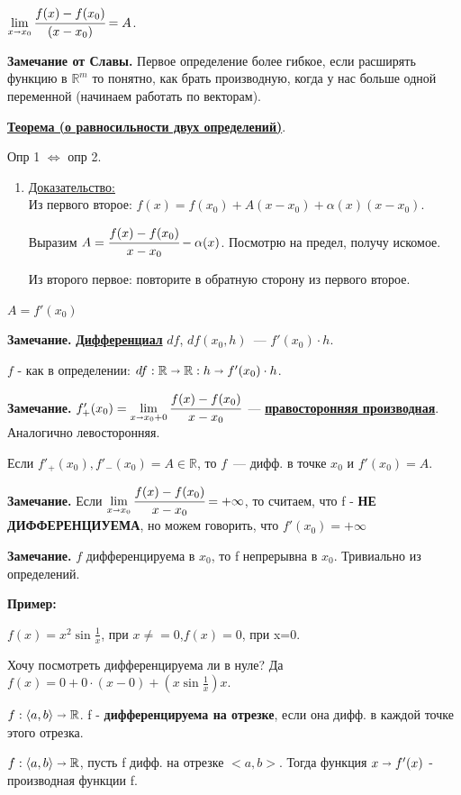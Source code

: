 \documentclass{article}
\newcommand{\deff}[1]{\underline{\textbf{#1}}}
\newcommand{\thmm}[1]{\underline{\textbf{#1}}}
\newcommand{\prooff}[1]{{\underline{Доказательство:}} \\ }
\begin{document}
$\lim\limits_{x\shortrightarrow x_0}\cfrac{f(x)-f(x_0)}{(x-x_0)} = A$.

\textbf{Замечание от Славы.} Первое определение более гибкое, если расширять функцию в $\mathbb{R}^m$ то понятно, как брать производную, когда у нас больше одной переменной (начинаем работать по векторам).

\thmm{Теорема (о равносильности двух определений)}.

Опр 1 $\Leftrightarrow$ опр 2.

\begin{enumerate}
    \item[] \prooff{}
    Из первого второе: $f(x) = f(x_0)  + A(x-x_0) + \alpha(x)(x-x_0)$.

    Выразим $A = \cfrac{f(x)-f(x_0)}{x-x_0} - \alpha(x)$. Посмотрю на предел, получу искомое.

    Из второго первое: повторите в обратную сторону из первого второе.
\end{enumerate}

$A = f'(x_0)$

\textbf{Замечание.} \deff{Дифференциал} $df$, $df(x_0,h)$~--- $f'(x_0) \cdot h$.

$f$ - как в определении: $df: \mathbb{R} \shortrightarrow \mathbb{R}: h \shortrightarrow f'(x_0) \cdot h$.

\textbf{Замечание.} $f'_+(x_0) = \lim\limits_{x \shortrightarrow x_0+0} \cfrac{f(x)-f(x_0)}{x-x_0}$~--- \deff{правосторонняя производная}. Аналогично левосторонняя.

Если $f'_+(x_0), f'_-(x_0) = A \in \mathbb{R}$, то $f$~--- дифф. в точке $x_0$ и $f'(x_0)=A$.

\textbf{Замечание.} Если $\lim\limits_{x \shortrightarrow x_0} \cfrac{f(x)-f(x_0)}{x-x_0} = +\infty$, то считаем, что f - \textbf{НЕ ДИФФЕРЕНЦИУЕМА}, но можем говорить, что $f'(x_0) = +\infty$
 
\textbf{Замечание.} $f $ дифференцируема в $x_0$, то f непрерывна в $x_0$. Тривиально из определений.

\textbf{Пример:}

$f(x) = x^2 \sin \frac{1}{x} $, при $x\neq =0$,$f(x)=0$, при x=0.

Хочу посмотреть дифференцируема ли в нуле? Да $f(x) = 0 + 0\cdot(x-0) + (x \sin \frac{1}{x})x $. 

$f:  \langle  a,b \rangle \shortrightarrow \mathbb{R}$. f - \textbf{дифференцируема на отрезке}, если она дифф. в каждой точке этого отрезка.

$f: \langle a,b\rangle \shortrightarrow \mathbb{R}$,  пусть f дифф. на отрезке $<a,b>$.  Тогда функция $x\shortrightarrow f'(x)$ - производная функции f.
\end{document}
